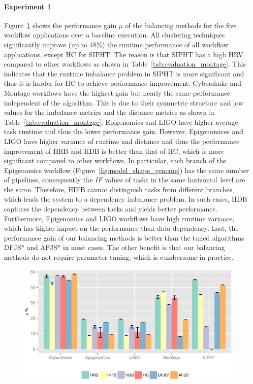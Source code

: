\paragraph{\textbf{Experiment 1}}
Figure~\ref{fig:evaluation_algorithm} shows the performance gain $\mu$ of the balancing methods for the five workflow applications over a baseline execution. All clustering techniques significantly improve (up to 48\%) the runtime performance of all workflow applications, except HC for SIPHT. The reason is that SIPHT has a high HRV compared to other workflows as shown in Table~\ref{tab:evaluation_montage}. This indicates that the runtime imbalance problem in SIPHT is more significant and thus it is harder for HC to achieve performance improvement. Cybershake and Montage workflows have the highest gain but nearly the same performance independent of the algorithm. This is due to their symmetric structure and low values for the imbalance metrics and the distance metrics as shown in Table~\ref{tab:evaluation_montage}. 
Epigenomics and LIGO have higher average task runtime and thus the lower performance gain. However, Epigenomices and LIGO have higher variance of runtime and distance and thus the performance improvement of HRB and HDB is better than that of HC, which is more significant compared to other workflows. 
In particular, each branch of the Epigenomics workflow (Figure~\ref{fig:model_shape_genome}) has the same number of pipelines, consequently the $IF$ values of tasks in the same horizontal level are the same. Therefore, HIFB cannot distinguish tasks from different branches, which leads the system to a dependency imbalance problem. In such cases, HDB captures the dependency between tasks and yields better performance. Furthermore, Epigenomics and LIGO workflows have high runtime variance, which has higher impact on the performance than data dependency. Last, the performance gain of our balancing methods is better than the tuned algorithms DFJS* and AFJS* in most cases. The other benefit is that our balancing methods do not require parameter tuning, which is cumbersome in practice. 

\begin{figure}[htb]
	\centering
	\includegraphics[width=0.8\linewidth]{figures/balance/figure20.eps}
	\label{fig:evaluation_algorithm}
\end{figure}

